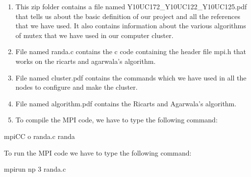 \documentclass[12pt]{article}
\author{harsh}
\title{}
\begin{document}
\begin{enumerate}
	\item This zip folder contains a file named
\hspace{15pt}Y10UC172\_Y10UC122\_Y10UC125.pdf that tells us about the
basic definition of our project and all the references that we have
used. It also contains information about the various algorithms of
mutex that we have used in our computer cluster.
	\item File named randa.c contains the c code containing the header file
mpi.h that works on the ricarts and agarwala's algorithm.
	\item File named cluster.pdf contains the commands which we have used in all
the nodes to configure and make the cluster.
	\item File named algorithm.pdf contains the Ricarts and Agarwala's
algorithm.
	\item To compile the MPI code, we have to type the following command:
\end{enumerate}


{\raggedright
mpiCC \textendash{}o randa.c randa
}

{\raggedright
To run the MPI code we have to type the following command:
}

{\raggedright
\hspace{15pt}mpirun \textendash{}np 3 randa.c
}
\end{document}
